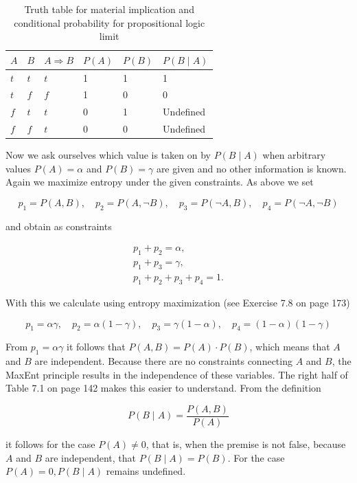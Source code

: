 \documentclass[10pt]{book}
\begin{document}
\begin{table}[htbp]
\centering
\caption{Truth table for material implication and conditional probability for propositional logic limit}
\begin{tabular}{|l|l|l|l|l|l|}
\hline
$A$ & $B$ & $A \Rightarrow B$ & $P(A)$ & $P(B)$ & $P(B \mid A)$ \\
\hline
$t$ & $t$ & $t$ & 1 & 1 & 1 \\
\hline
$t$ & $f$ & $f$ & 1 & 0 & 0 \\
\hline
$f$ & $t$ & $t$ & 0 & 1 & Undefined \\
\hline
$f$ & $f$ & $t$ & 0 & 0 & Undefined \\
\hline
\end{tabular}
\end{table}

Now we ask ourselves which value is taken on by $P(B \mid A)$ when arbitrary values $P(A)=\alpha$ and $P(B)=\gamma$ are given and no other information is known. Again we maximize entropy under the given constraints. As above we set

$$
p_{1}=P(A, B), \quad p_{2}=P(A, \neg B), \quad p_{3}=P(\neg A, B), \quad p_{4}=P(\neg A, \neg B)
$$

and obtain as constraints

\begin{gather*}
p_{1}+p_{2}=\alpha,  \tag{7.10}\\
p_{1}+p_{3}=\gamma,  \tag{7.11}\\
p_{1}+p_{2}+p_{3}+p_{4}=1 . \tag{7.12}
\end{gather*}

With this we calculate using entropy maximization (see Exercise 7.8 on page 173)

$$
p_{1}=\alpha \gamma, \quad p_{2}=\alpha(1-\gamma), \quad p_{3}=\gamma(1-\alpha), \quad p_{4}=(1-\alpha)(1-\gamma)
$$

From $p_{1}=\alpha \gamma$ it follows that $P(A, B)=P(A) \cdot P(B)$, which means that $A$ and $B$ are independent. Because there are no constraints connecting $A$ and $B$, the MaxEnt principle results in the independence of these variables. The right half of Table 7.1 on page 142 makes this easier to understand. From the definition

$$
P(B \mid A)=\frac{P(A, B)}{P(A)}
$$

it follows for the case $P(A) \neq 0$, that is, when the premise is not false, because $A$ and $B$ are independent, that $P(B \mid A)=P(B)$. For the case $P(A)=0, P(B \mid A)$ remains undefined.
\end{document}
